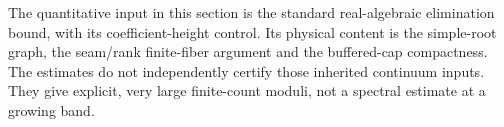 The quantitative input in this section is the standard real-algebraic
elimination bound, with its coefficient-height control. Its physical
content is the simple-root graph, the seam/rank finite-fiber argument
and the buffered-cap compactness. The estimates do not independently
certify those inherited continuum inputs. They give explicit, very
large finite-count moduli, not a spectral estimate at a growing band.
